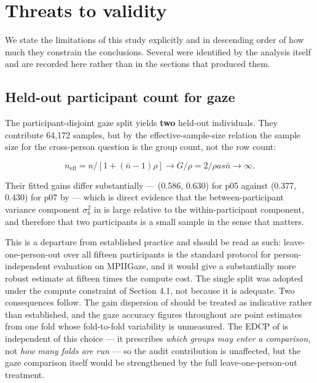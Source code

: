 \FloatBarrier

\section{Threats to validity}

We state the limitations of this study explicitly and in descending order of how much they constrain the conclusions. Several were identified by the analysis itself and are recorded here rather than in the sections that produced them.

\FloatBarrier

\subsection{Held-out participant count for gaze}

The participant-disjoint gaze split yields \textbf{two} held-out individuals. They contribute 64,172 samples, but by the effective-sample-size relation  the sample size for the cross-person question is the group count, not the row count:

\begin{equation}
\label{eq:303}
n_{\mathrm{eff}} = n / [ 1 + (\bar{n} - 1) \rho ] \to G/\rho = 2/\rho as \bar{n} \to \infty .
\end{equation}

Their fitted gains differ substantially --- (0.586, 0.630) for p05 against (0.377, 0.430) for p07 by  --- which is direct evidence that the between-participant variance component $\sigma_{b}^{2}$ in  is large relative to the within-participant component, and therefore that two participants is a small sample in the sense that matters.

This is a departure from established practice and should be read as such: leave-one-person-out over all fifteen participants is the standard protocol for person-independent evaluation on MPIIGaze, and it would give a substantially more robust estimate at fifteen times the compute cost. The single split was adopted under the compute constraint of Section 4.1, not because it is adequate. Two consequences follow. The gain dispersion of  should be treated as indicative rather than established, and the gaze accuracy figures throughout are point estimates from one fold whose fold-to-fold variability is unmeasured. The EDCP of  is independent of this choice --- it prescribes \emph{which groups may enter a comparison}, not \emph{how many folds are run} --- so the audit contribution is unaffected, but the gaze comparison itself would be strengthened by the full leave-one-person-out treatment.

